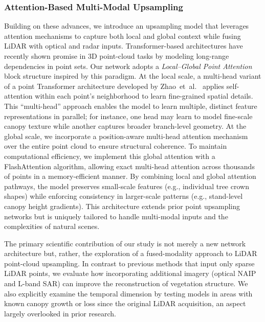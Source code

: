 \documentclass[remotesensing,article,accept,pdftex,moreauthors]{Definitions/mdpi}
\renewcommand{\hl}[1]{#1}
\begin{document}
\subsubsection*{\hl{Attention-Based} %
 Multi-Modal Upsampling}

Building on these advances, we introduce an upsampling model that leverages attention mechanisms to capture both local and global context while fusing LiDAR with optical and radar inputs. Transformer-based architectures have recently shown promise in 3D point-cloud tasks by modeling long-range dependencies in point sets. Our network adopts a \emph{\hl{Local--Global Point Attention}} block structure inspired by this paradigm. At the local scale, a multi-head variant of a point Transformer architecture developed by \mbox{Zhao et al. \cite{zhao2021point}} applies self-attention within each point’s neighborhood to learn fine-grained spatial details. This “multi-head” approach enables the model to learn multiple, distinct feature representations in parallel; for instance, one head may learn to model fine-scale canopy texture while another captures broader branch-level geometry. At the global scale, we incorporate a position-aware multi-head attention mechanism over the entire point cloud to ensure structural coherence. To maintain computational efficiency, we implement this global attention with a FlashAttention \cite{dao2022flashattention} algorithm, allowing exact multi-head attention across thousands of points in a memory-efficient manner. By combining local and global attention pathways, the model preserves small-scale features (e.g., individual tree crown shapes) while enforcing consistency in larger-scale patterns (e.g., stand-level canopy height gradients). This architecture extends prior point upsampling networks but is uniquely tailored to handle multi-modal inputs and the complexities of natural scenes.

The primary scientific contribution of our study is not merely a new network architecture but, rather, the exploration of a fused-modality approach to LiDAR point-cloud upsampling. In contrast to previous methods that input only sparse LiDAR points, we evaluate how incorporating additional imagery (optical NAIP and L-band SAR) can improve the reconstruction of vegetation structure. We also explicitly examine the temporal dimension by testing models in areas with known canopy growth or loss since the original LiDAR acquisition, an aspect largely overlooked in prior research.
\end{document}
